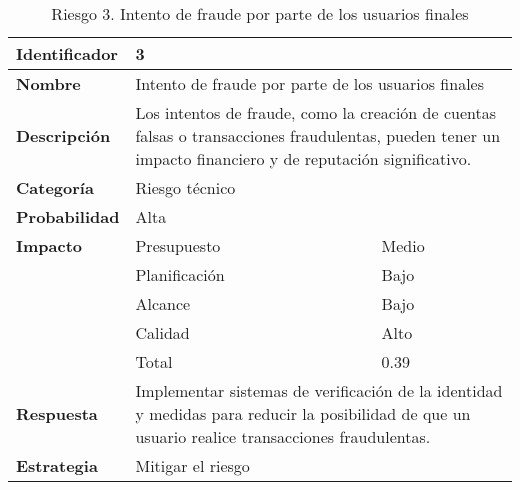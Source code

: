 \begin{table}[H]
    \centering
    \caption{Riesgo 3. Intento de fraude por parte de los usuarios finales}
    \label{table:risk_fraude}
    \begin{tabular}{>{\columncolor{rowcolor}}l l l}
    \toprule
    \rowcolor{lightgreen}
    \textbf{Identificador} & \multicolumn{2}{l}{3} \\
    \midrule
    \textbf{Nombre} & \multicolumn{2}{l}{Intento de fraude por parte de los usuarios finales} \\
    \midrule
    \textbf{Descripción} & \multicolumn{2}{p{10cm}}{Los intentos de fraude, como la creación de cuentas falsas o transacciones fraudulentas, pueden tener un impacto financiero y de reputación significativo.} \\
    \midrule
    \textbf{Categoría} & \multicolumn{2}{l}{Riesgo técnico} \\
    \midrule
    \textbf{Probabilidad} & \multicolumn{2}{l}{Alta} \\
    \midrule
    \textbf{Impacto} & Presupuesto & Medio \\
    \cmidrule(lr){2-3}
    & Planificación & Bajo \\
    \cmidrule(lr){2-3}
    & Alcance & Bajo \\
    \cmidrule(lr){2-3}
    & Calidad & Alto \\
    \cmidrule(lr){2-3}
    & Total & 0.39 \\
    \midrule
    \textbf{Respuesta} & \multicolumn{2}{p{10cm}}{Implementar sistemas de verificación de la identidad y medidas para reducir la posibilidad de que un usuario realice transacciones fraudulentas.} \\
    \midrule
    \textbf{Estrategia} & \multicolumn{2}{l}{Mitigar el riesgo} \\
    \bottomrule
    \end{tabular}
\end{table}


